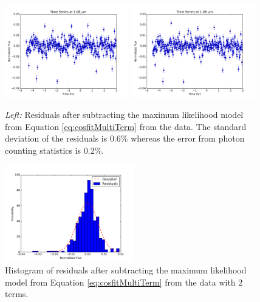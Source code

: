 \documentclass[twocolumn]{aastex6}
\begin{document}
\begin{figure}
\begin{centering}
\includegraphics[width=0.48\textwidth]{residual_2term_1080nm.pdf}
\includegraphics[width=0.48\textwidth]{residual_3term_1080nm.pdf}
\caption{{\it Left:} Residuals after subtracting the maximum likelihood model from Equation \ref{eq:cosfitMultiTerm} from the data. The standard deviation of the residuals is 0.6\% whereas the error from photon counting statistics is 0.2\%.}\label{fig:resid2Cosfit}
\end{centering}
\end{figure}

\begin{figure}
\begin{centering}
\includegraphics[width=0.5\textwidth]{histo_resids.pdf}
\caption{Histogram of residuals after subtracting the maximum likelihood model from Equation \ref{eq:cosfitMultiTerm} from the data with 2 terms.}\label{fig:histoResid2Cosfit}
\end{centering}
\end{figure}
\end{document}
